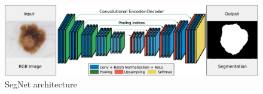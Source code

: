 \begin{figure}
    \centerline{\includegraphics[width=1\columnwidth]{02-related-works/figures/segnet-architecture.png}}
    \caption{ SegNet architecture \cite{badrinarayanan2017segnet} }
    \label{figure:segnet-architecture}
\end{figure}